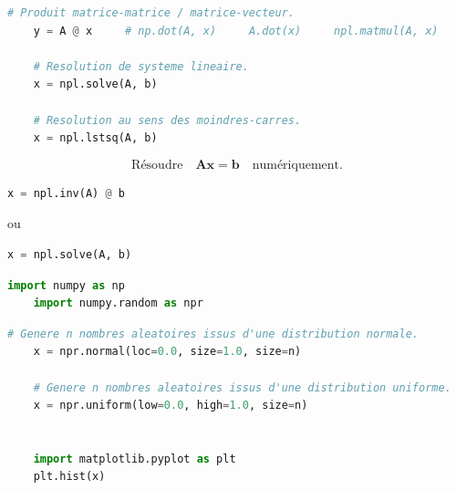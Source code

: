 \documentclass[aspectratio=169]{beamer}
\begin{document}
\begin{frame}[fragile]{}{}
  \vfill
  \begin{lstlisting}[language=Python]
    # Produit matrice-matrice / matrice-vecteur.
    y = A @ x     # np.dot(A, x)     A.dot(x)     npl.matmul(A, x)

    # Resolution de systeme lineaire.
    x = npl.solve(A, b)

    # Resolution au sens des moindres-carres.
    x = npl.lstsq(A, b)
  \end{lstlisting}
  \vfill
\end{frame}





\begin{frame}[fragile]{}{}
  \centering

  \[
  \textrm{Résoudre} \quad \bm{Ax} = \bm{b} \quad \textrm{numériquement}.
  \]

  \bigskip

  \begin{minipage}{.4\textwidth}
    \begin{lstlisting}[language=Python]
      x = npl.inv(A) @ b
    \end{lstlisting}
  \end{minipage}%
  \hfill
  \begin{minipage}{.2\textwidth}
    \centering
    ou
  \end{minipage}%
  \hfill
  \begin{minipage}{.4\textwidth}
    \begin{lstlisting}[language=Python]
      x = npl.solve(A, b)
    \end{lstlisting}
  \end{minipage}
\end{frame}







\begin{frame}[fragile]{}{}
  \vfill
  \begin{lstlisting}[language=Python]
    import numpy as np
    import numpy.random as npr
  \end{lstlisting}
  \vfill
\end{frame}

\begin{frame}[fragile]{}{}
  \vfill
  \begin{lstlisting}[language=Python]
    # Genere n nombres aleatoires issus d'une distribution normale.
    x = npr.normal(loc=0.0, size=1.0, size=n)

    # Genere n nombres aleatoires issus d'une distribution uniforme.
    x = npr.uniform(low=0.0, high=1.0, size=n)


    import matplotlib.pyplot as plt
    plt.hist(x)
  \end{lstlisting}
  \vfill
\end{frame}
\end{document}
